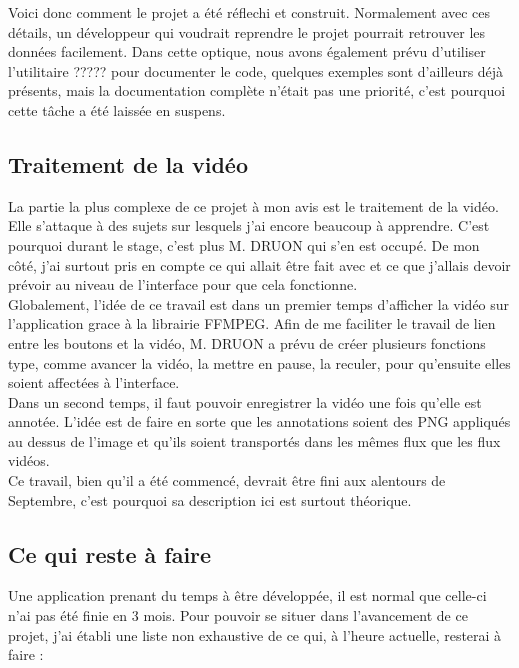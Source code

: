 \documentclass[11pt,french,a4paper]{report}
\begin{document}
Voici donc comment le projet a été réflechi et construit. Normalement avec ces détails, un développeur qui voudrait reprendre
le projet pourrait retrouver les données facilement. Dans cette optique, nous avons également prévu d'utiliser %
l'utilitaire ????? pour documenter le code, quelques exemples sont d'ailleurs déjà présents, mais la documentation 
complète n'était pas une priorité, c'est pourquoi cette tâche a été laissée en suspens. 
       
        \subsection{Traitement de la vidéo}
La partie la plus complexe de ce projet à mon avis est le traitement de la vidéo. Elle s'attaque à des sujets sur lesquels j'ai 
encore beaucoup à apprendre. C'est pourquoi durant le stage, c'est plus M. DRUON qui s'en est occupé. De mon côté, j'ai surtout
pris en compte ce qui allait être fait avec et ce que j'allais devoir prévoir au niveau de l'interface pour que cela fonctionne. \\
Globalement, l'idée de ce travail est dans un premier temps d'afficher la vidéo sur l'application grace à 
la librairie FFMPEG. Afin de me faciliter
le travail de lien entre les boutons et la vidéo, M. DRUON a prévu de créer plusieurs fonctions type, comme avancer la vidéo, la 
mettre en pause, la reculer, pour qu'ensuite elles soient affectées à l'interface. \\
Dans un second temps, il faut pouvoir enregistrer la vidéo une fois qu'elle est annotée. L'idée est de faire en sorte que les annotations
soient des PNG appliqués au dessus de l'image et qu'ils soient transportés dans les mêmes flux que les flux vidéos. \\

Ce travail, bien qu'il a été commencé, devrait être fini aux alentours de Septembre, c'est pourquoi sa description ici
est surtout théorique. \\


        \subsection{Ce qui reste à faire}
Une application prenant du temps à être développée, il est normal que celle-ci n'ai pas été finie en 3 mois. Pour pouvoir se situer
dans l'avancement de ce projet, j'ai établi une liste non exhaustive de ce qui, à l'heure actuelle, resterai à faire : \\ 
\end{document}
